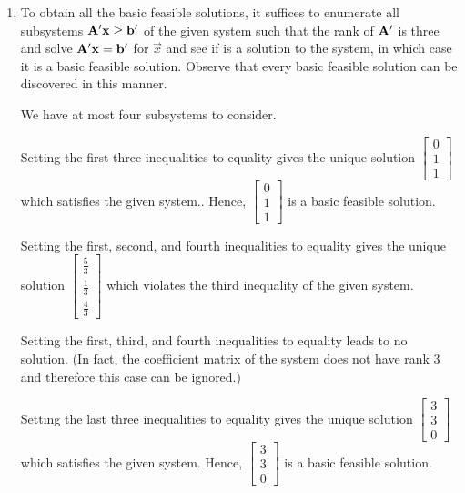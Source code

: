 \begin{enumerate}
\def\labelenumi{\arabic{enumi}.}
\item
  To obtain all the basic feasible solutions, it suffices to enumerate
  all subsystems \(\mathbf{A}' \mathbf{x} \geq \mathbf{b}'\) of the given system
  such that the rank of \(\mathbf{A}'\) is three and solve
  \(\mathbf{A}' \mathbf{x} = \mathbf{b}'\) for \(\vec{x}\) and see if is a
  solution to the system, in which case it is a basic feasible solution.
  Observe that every basic feasible solution can be discovered in this
  manner.

  We have at most four subsystems to consider.

  Setting the first three inequalities to equality gives the unique
  solution \(\begin{bmatrix} 0 \\ 1 \\ 1 \end{bmatrix}\) which satisfies
  the given system.. Hence,
  \(\begin{bmatrix} 0 \\ 1 \\ 1 \end{bmatrix}\) is a basic feasible
  solution.

  Setting the first, second, and fourth inequalities to equality gives
  the unique solution
  \(\begin{bmatrix} \frac{5}{3} \\ \frac{1}{3} \\ \frac{4}{3} \end{bmatrix}\)
  which violates the third inequality of the given system.

  Setting the first, third, and fourth inequalities to equality leads to
  no solution. (In fact, the coefficient matrix of the system does not
  have rank 3 and therefore this case can be ignored.)

  Setting the last three inequalities to equality gives the unique
  solution \(\begin{bmatrix} 3 \\ 3 \\ 0 \end{bmatrix}\) which satisfies
  the given system. Hence, \(\begin{bmatrix} 3 \\ 3 \\ 0 \end{bmatrix}\)
  is a basic feasible solution.


\end{enumerate}
